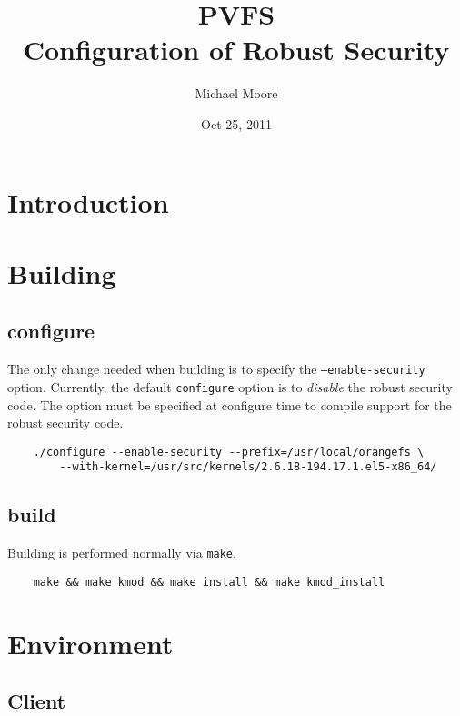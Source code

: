 \documentclass[11pt, letterpaper]{article}
\title{PVFS\\Configuration of Robust Security}
\author{ Michael Moore }
\date{ Oct 25, 2011 }
\begin{document}
\maketitle

\tableofcontents

\newpage

\thispagestyle{plain}


\section{Introduction}

\section{Building}

\subsection{configure}
The only change needed when building is to specify the 
\texttt{--enable-security} option. Currently, the default \texttt{configure} 
option is to \emph{disable} the robust security code. The option must be 
specified at configure time to compile support for the robust security code.

\begin{verbatim}
    ./configure --enable-security --prefix=/usr/local/orangefs \
        --with-kernel=/usr/src/kernels/2.6.18-194.17.1.el5-x86_64/
\end{verbatim}

\subsection{build}
Building is performed normally via \texttt{make}.

\begin{verbatim}
    make && make kmod && make install && make kmod_install
\end{verbatim}

\section{Environment}

\subsection{Client}
\end{document}
